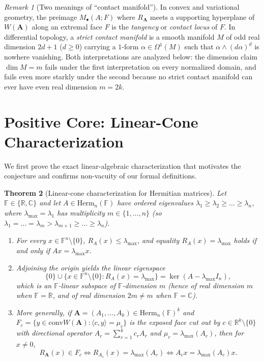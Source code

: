 \documentclass[11pt,a4paper]{article}
\newtheorem{theorem}{Theorem}[section]
\theoremstyle{definition}
\theoremstyle{remark}
\newtheorem{remark}[theorem]{Remark}
\newcommand{\RR}{\mathbb{R}}
\newcommand{\CC}{\mathbb{C}}
\newcommand{\FF}{\mathbb{F}}
\newcommand{\Herm}{\mathrm{Herm}}
\newcommand{\conv}{\mathrm{conv}}
\begin{document}
\begin{remark}[Two meanings of ``contact manifold'']
\label{rem:contact_meanings}
In convex and variational geometry, the preimage $M_{\bullet}(A; F)$ where $R_{\mathbf{A}}$ meets a supporting hyperplane of $W(\mathbf{A})$ along an extremal face $F$ is the \emph{tangency} or \emph{contact locus} of $F$. In differential topology, a \emph{strict contact manifold} is a smooth manifold $M$ of odd real dimension $2d + 1$ ($d \ge 0$) carrying a $1$-form $\alpha \in \Omega^1(M)$ such that $\alpha \wedge (d\alpha)^d$ is nowhere vanishing. Both interpretations are analyzed below: the dimension claim $\dim M = m$ fails under the first interpretation on every normalized domain, and fails even more starkly under the second because no strict contact manifold can ever have even real dimension $m = 2k$.
\end{remark}

\section{Positive Core: Linear-Cone Characterization}
\label{sec:positive}

We first prove the exact linear-algebraic characterization that motivates the conjecture and confirms non-vacuity of our formal definitions.

\begin{theorem}[Linear-cone characterization for Hermitian matrices]
\label{thm:linear_cone}
Let $\FF \in \{\RR, \CC\}$ and let $A \in \Herm_n(\FF)$ have ordered eigenvalues $\lambda_1 \ge \lambda_2 \ge \dots \ge \lambda_n$, where $\lambda_{\max} = \lambda_1$ has multiplicity $m \in \{1, \dots, n\}$ (so $\lambda_1 = \dots = \lambda_m > \lambda_{m+1} \ge \dots \ge \lambda_n$).
\begin{enumerate}
  \item[(a)] For every $x \in \FF^n \setminus \{0\}$, $R_A(x) \le \lambda_{\max}$, and equality $R_A(x) = \lambda_{\max}$ holds if and only if $A x = \lambda_{\max} x$.
  \item[(b)] Adjoining the origin yields the linear eigenspace
  \[
    \{0\} \cup \{x \in \FF^n \setminus \{0\} : R_A(x) = \lambda_{\max}\} = \ker(A - \lambda_{\max} I_n),
  \]
  which is an $\FF$-linear subspace of $\FF$-dimension $m$ (hence of real dimension $m$ when $\FF = \RR$, and of real dimension $2m \neq m$ when $\FF = \CC$).
  \item[(c)] More generally, if $\mathbf{A} = (A_1, \dots, A_k) \in \Herm_n(\FF)^k$ and $F_c = \{y \in \conv W(\mathbf{A}) : \langle c, y \rangle = \mu_c\}$ is the exposed face cut out by $c \in \RR^k \setminus \{0\}$ with directional operator $A_c = \sum_{r=1}^k c_r A_r$ and $\mu_c = \lambda_{\max}(A_c)$, then for $x \neq 0$,
  \[
    R_{\mathbf{A}}(x) \in F_c \iff R_{A_c}(x) = \lambda_{\max}(A_c) \iff A_c x = \lambda_{\max}(A_c) x.
  \]
\end{enumerate}
\end{theorem}
\end{document}
